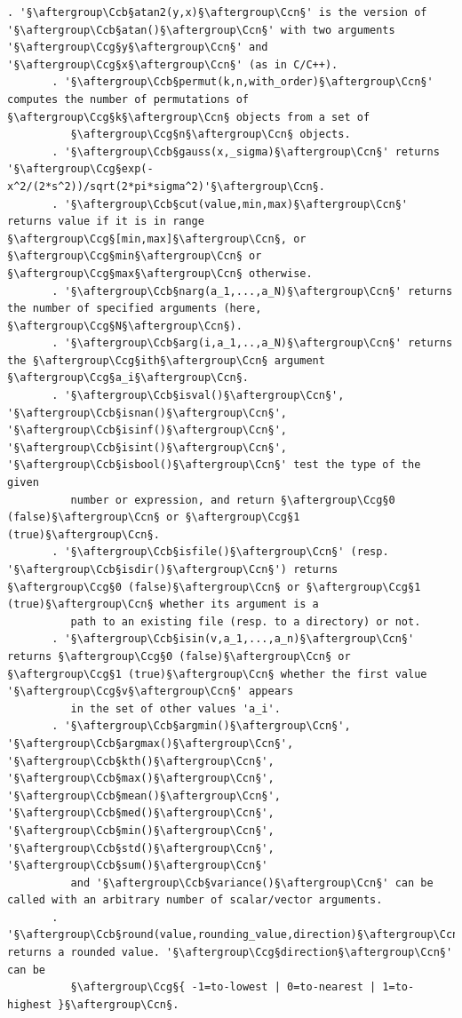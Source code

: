\documentclass[a4paper,10.5pt,twoside]{book}
\def\Ccb{\color{cb}}
\def\Ccg{\color{cc}}
\def\Ccn{\color{black}}
\begin{document}
\begin{lstlisting}[escapechar=§]
       . '§\aftergroup\Ccb§atan2(y,x)§\aftergroup\Ccn§' is the version of '§\aftergroup\Ccb§atan()§\aftergroup\Ccn§' with two arguments '§\aftergroup\Ccg§y§\aftergroup\Ccn§' and '§\aftergroup\Ccg§x§\aftergroup\Ccn§' (as in C/C++). 
       . '§\aftergroup\Ccb§permut(k,n,with_order)§\aftergroup\Ccn§' computes the number of permutations of §\aftergroup\Ccg§k§\aftergroup\Ccn§ objects from a set of 
          §\aftergroup\Ccg§n§\aftergroup\Ccn§ objects. 
       . '§\aftergroup\Ccb§gauss(x,_sigma)§\aftergroup\Ccn§' returns '§\aftergroup\Ccg§exp(-x^2/(2*s^2))/sqrt(2*pi*sigma^2)'§\aftergroup\Ccn§. 
       . '§\aftergroup\Ccb§cut(value,min,max)§\aftergroup\Ccn§' returns value if it is in range §\aftergroup\Ccg§[min,max]§\aftergroup\Ccn§, or §\aftergroup\Ccg§min§\aftergroup\Ccn§ or §\aftergroup\Ccg§max§\aftergroup\Ccn§ otherwise. 
       . '§\aftergroup\Ccb§narg(a_1,...,a_N)§\aftergroup\Ccn§' returns the number of specified arguments (here, §\aftergroup\Ccg§N§\aftergroup\Ccn§). 
       . '§\aftergroup\Ccb§arg(i,a_1,..,a_N)§\aftergroup\Ccn§' returns the §\aftergroup\Ccg§ith§\aftergroup\Ccn§ argument §\aftergroup\Ccg§a_i§\aftergroup\Ccn§. 
       . '§\aftergroup\Ccb§isval()§\aftergroup\Ccn§', '§\aftergroup\Ccb§isnan()§\aftergroup\Ccn§', '§\aftergroup\Ccb§isinf()§\aftergroup\Ccn§', '§\aftergroup\Ccb§isint()§\aftergroup\Ccn§', '§\aftergroup\Ccb§isbool()§\aftergroup\Ccn§' test the type of the given 
          number or expression, and return §\aftergroup\Ccg§0 (false)§\aftergroup\Ccn§ or §\aftergroup\Ccg§1 (true)§\aftergroup\Ccn§. 
       . '§\aftergroup\Ccb§isfile()§\aftergroup\Ccn§' (resp. '§\aftergroup\Ccb§isdir()§\aftergroup\Ccn§') returns §\aftergroup\Ccg§0 (false)§\aftergroup\Ccn§ or §\aftergroup\Ccg§1 (true)§\aftergroup\Ccn§ whether its argument is a 
          path to an existing file (resp. to a directory) or not. 
       . '§\aftergroup\Ccb§isin(v,a_1,...,a_n)§\aftergroup\Ccn§' returns §\aftergroup\Ccg§0 (false)§\aftergroup\Ccn§ or §\aftergroup\Ccg§1 (true)§\aftergroup\Ccn§ whether the first value '§\aftergroup\Ccg§v§\aftergroup\Ccn§' appears 
          in the set of other values 'a_i'. 
       . '§\aftergroup\Ccb§argmin()§\aftergroup\Ccn§', '§\aftergroup\Ccb§argmax()§\aftergroup\Ccn§', '§\aftergroup\Ccb§kth()§\aftergroup\Ccn§', '§\aftergroup\Ccb§max()§\aftergroup\Ccn§', '§\aftergroup\Ccb§mean()§\aftergroup\Ccn§', '§\aftergroup\Ccb§med()§\aftergroup\Ccn§', '§\aftergroup\Ccb§min()§\aftergroup\Ccn§', '§\aftergroup\Ccb§std()§\aftergroup\Ccn§', '§\aftergroup\Ccb§sum()§\aftergroup\Ccn§' 
          and '§\aftergroup\Ccb§variance()§\aftergroup\Ccn§' can be called with an arbitrary number of scalar/vector arguments. 
       . '§\aftergroup\Ccb§round(value,rounding_value,direction)§\aftergroup\Ccn§' returns a rounded value. '§\aftergroup\Ccg§direction§\aftergroup\Ccn§' can be 
          §\aftergroup\Ccg§{ -1=to-lowest | 0=to-nearest | 1=to-highest }§\aftergroup\Ccn§. 
 

\end{lstlisting}
\end{document}
